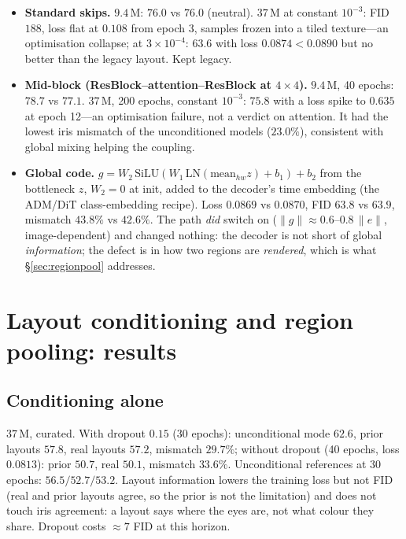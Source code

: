 \documentclass[11pt]{article}
\begin{document}
\begin{itemize}[leftmargin=1.5em,itemsep=1pt]
\item \textbf{Standard skips.} $9.4$\,M: $76.0$ vs $76.0$ (neutral). $37$\,M at
      constant $10^{-3}$: FID $188$, loss flat at $0.108$ from epoch 3, samples frozen
      into a tiled texture---an optimisation collapse; at $3\times10^{-4}$: $63.6$ with
      loss $0.0874<0.0890$ but no better than the legacy layout. Kept legacy.
\item \textbf{Mid-block (ResBlock--attention--ResBlock at $4\times4$).} $9.4$\,M, 40
      epochs: $78.7$ vs $77.1$. $37$\,M, 200 epochs, constant $10^{-3}$: $75.8$ with a
      loss spike to $0.635$ at epoch 12---an optimisation failure, not a verdict on
      attention. It had the lowest iris mismatch of the unconditioned models ($23.0\%$),
      consistent with global mixing helping the coupling.
\item \textbf{Global code.} $g=W_2\,\mathrm{SiLU}(W_1\,\mathrm{LN}(\text{mean}_{hw}z)+b_1)+b_2$
      from the bottleneck $z$, $W_2=0$ at init, added to the decoder's time embedding
      (the ADM/DiT class-embedding recipe). Loss $0.0869$ vs $0.0870$, FID $63.8$ vs
      $63.9$, mismatch $43.8\%$ vs $42.6\%$. The path \emph{did} switch on
      ($\|g\|\approx0.6$--$0.8\,\|e\|$, image-dependent) and changed nothing: the
      decoder is not short of global \emph{information}; the defect is in how two
      regions are \emph{rendered}, which is what \S\ref{sec:regionpool} addresses.
\end{itemize}

\section{Layout conditioning and region pooling: results}\label{sec:layout}

\subsection{Conditioning alone}\label{sec:condres}

$37$\,M, curated. With dropout $0.15$ (30 epochs): unconditional mode $62.6$, prior
layouts $57.8$, real layouts $57.2$, mismatch $29.7\%$; without dropout (40 epochs, loss
$0.0813$): prior $50.7$, real $50.1$, mismatch $33.6\%$. Unconditional references at
30 epochs: $56.5/52.7/53.2$. Layout information lowers the training loss but not FID
(real and prior layouts agree, so the prior is not the limitation) and does not touch
iris agreement: a layout says where the eyes are, not what colour they share. Dropout
costs $\approx7$ FID at this horizon.
\end{document}
